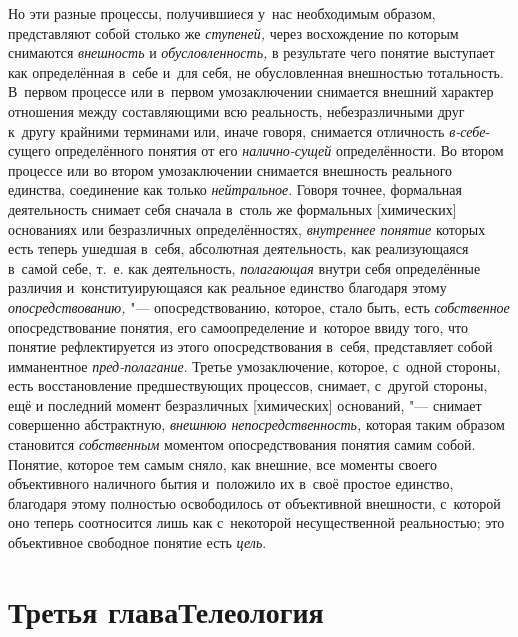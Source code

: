 Но эти разные процессы, получившиеся у~нас необходимым
образом, представляют собой столько же
{\em ступеней,} через
восхождение по которым снимаются
{\em внешность} и
{\em обусловленность,} в
результате чего понятие выступает как определённая в~себе и~для себя, не
обусловленная внешностью тотальность. В~первом процессе или в~первом
умозаключении снимается внешний характер отношения между составляющими всю
реальность, небезразличными друг к~другу крайними терминами или, иначе
говоря, снимается отличность
{\em в-себе}-сущего
определённого понятия от его
{\em налично-сущей}
определённости. Во втором процессе или во втором
умозаключении снимается внешность реального единства, соединение как только
{\em нейтральное}. Говоря
точнее, формальная деятельность снимает себя сначала в~столь же формальных
[химических] основаниях или безразличных определённостях,
{\em внутреннее понятие}
которых есть теперь ушедшая в~себя, абсолютная деятельность,
как реализующаяся в~самой себе, т.~е. как деятельность,
{\em полагающая} внутри
себя определённые различия и~конституирующаяся как реальное единство
благодаря этому {\em опосредствованию,}
"--- опосредствованию, которое, стало быть, есть
{\em собственное}
опосредствование понятия, его самоопределение и~которое ввиду
того, что понятие рефлектируется из этого опосредствования в~себя,
представляет собой имманентное
{\em пред-полагание}.
Третье умозаключение, которое, с~одной стороны, есть
восстановление предшествующих процессов, снимает, с~другой стороны, ещё и
последний момент безразличных [химических] оснований, "---
снимает совершенно абстрактную,
{\em внешнюю непосредственность,}
которая таким образом становится
{\em собственным}
моментом опосредствования понятия самим собой. Понятие,
которое тем самым сняло, как внешние, все моменты своего объективного
наличного бытия и~положило их в~своё простое единство, благодаря этому
полностью освободилось от объективной внешности, с~которой оно теперь
соотносится лишь как с~некоторой несущественной реальностью; это
объективное свободное понятие есть
{\em цель}.

\chapter[Третья глава Телеология]{Третья глава\newline Телеология}

